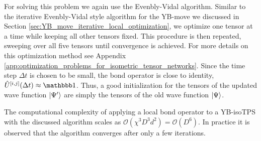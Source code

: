 For solving this problem we again use the Evenbly-Vidal algorithm. Similar to the iterative Evenbly-Vidal style algorithm for the YB-move we discussed in Section \ref{sec:YB_move_iterative_local_optimization}, we optimize one tensor at a time while keeping all other tensors fixed. This procedure is then repeated, sweeping over all five tensors until convergence is achieved. For more details on this optimization method see Appendix \ref{app:optimization_problems_for_isometric_tensor_networks}. Since the time step $\Delta t$ is chosen to be small, the bond operator is close to identity, $\hat{U}^{[i,j]}(\Delta t)\approx\id$. Thus, a good initialization for the tensors of the updated wave function $\ket{\Psi^\prime}$ are simply the tensors of the old wave function $\ket{\Psi}$. \par
The computational complexity of applying a local bond operator to a YB-isoTPS with the discussed algorithm scales as $\mathcal{O}(\chi^3D^3d^2) = \mathcal{O}(D^6)$. In practice it is observed that the algorithm converges after only a few iterations.